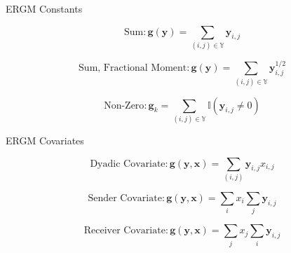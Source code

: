 \documentclass{beamer}
\begin{document}
\begin{frame}{ERGM Constants}

$$\text{Sum}:\bm{g(y)} = \sum_{(i,j) {\in} \mathbb{Y}}\bm{y}_{i,j}$$

$$\text{Sum, Fractional Moment}:\bm{g(y)} = \sum_{(i,j) {\in} \mathbb{Y}}\bm{y}_{i,j}^{1/2}$$

$$\text{Non-Zero}: \bm{g}_k = \sum_{(i,j) {\in} \mathbb{Y}} \mathbb{I}(\bm{y}_{i,j} \neq 0)$$

\end{frame}


\begin{frame}{ERGM Covariates}

$$ \text{Dyadic Covariate}: \bm{g(y,x)} = \sum_{(i,j)} \bm{y}_{i,j}x_{i,j}$$ 

$$ \text{Sender Covariate}: \bm{g(y,x)} = \sum_{i}x_i \sum_{j} \bm{y}_{i,j}$$

$$ \text{Receiver Covariate}: \bm{g(y,x)} = \sum_{j}x_j \sum_{i} \bm{y}_{i,j}$$
 

\end{frame}
\end{document}
